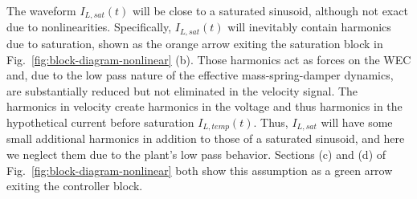\documentclass{ifacconf}
\begin{document}
The waveform $I_{L,sat}(t)$ will be close to a saturated sinusoid, although not exact due to nonlinearities. Specifically, $I_{L,sat}(t)$ will inevitably contain harmonics due to saturation, shown as the orange arrow exiting the saturation block in Fig.~\ref{fig:block-diagram-nonlinear} (b). Those harmonics act as forces on the WEC and, due to the low pass nature of the effective mass-spring-damper dynamics, are substantially reduced but not eliminated in the velocity signal. The harmonics in velocity create harmonics in the voltage and thus harmonics in the hypothetical current before saturation $I_{L,temp}(t)$. Thus, $I_{L,sat}$ will have some small additional harmonics in addition to those of a saturated sinusoid, and here we neglect them due to the plant's low pass behavior. Sections (c) and (d) of Fig.~\ref{fig:block-diagram-nonlinear} both show this assumption as a green arrow exiting the controller block.
\end{document}
